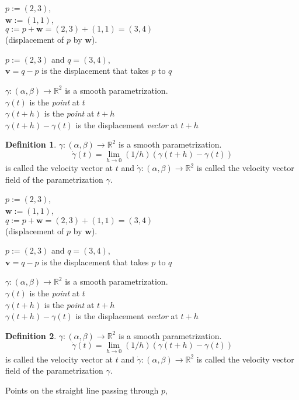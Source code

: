 \documentclass[twocolumn,20pt,fleqn]{extarticle}
\newcommand{\sep}{\vspace{0.5cm}}
\theoremstyle{plain}
\theoremstyle{definition}
\newtheorem*{definition}{Definition}
\theoremstyle{remark}
\begin{document}
$p := (2,3)$,\\ $\mathbf{w} := (1,1)$,\\ $q:=p + \mathbf{w} = (2,3) + (1,1) = (3,4)$ \\ (displacement of $p$ by $\mathbf{w}$).

\sep
$p := (2,3)$ and $q=(3,4)$,\\
$\mathbf{v}= q - p$ is the displacement that takes $p$ to $q$ 
\sep

$\gamma : (\alpha,\beta) \to \mathbb{R}^2$ is a smooth parametrization.\\
$\gamma(t)$ is the \emph{point} at $t$\\
$\gamma(t+h)$ is the \emph{point} at $t+h$\\
$\gamma(t+h)-\gamma(t)$ is the displacement \emph{vector} at $t+h$\\



\begin{definition}
$\gamma : (\alpha,\beta) \to \mathbb{R}^2$ is a smooth parametrization.
\[\dot{\gamma}(t) = \lim_{h\to 0} (1/h)(\gamma(t+h) - \gamma(t))\]
is called the velocity vector at $t$ and $\dot{\gamma} : (\alpha, \beta) \to \mathbb{R}^2$ is called the velocity vector field of the parametrization $\gamma$.
\end{definition}



\clearpage



$p := (2,3)$,\\ $\mathbf{w} := (1,1)$,\\ $q:=p + \mathbf{w} = (2,3) + (1,1) = (3,4)$ \\ (displacement of $p$ by $\mathbf{w}$).

\sep
$p := (2,3)$ and $q=(3,4)$,\\
$\mathbf{v}= q - p$ is the displacement that takes $p$ to $q$ 
\sep

$\gamma : (\alpha,\beta) \to \mathbb{R}^2$ is a smooth parametrization.\\
$\gamma(t)$ is the \emph{point} at $t$\\
$\gamma(t+h)$ is the \emph{point} at $t+h$\\
$\gamma(t+h)-\gamma(t)$ is the displacement \emph{vector} at $t+h$\\



\begin{definition}
$\gamma : (\alpha,\beta) \to \mathbb{R}^2$ is a smooth parametrization.
\[\dot{\gamma}(t) = \lim_{h\to 0} (1/h)(\gamma(t+h) - \gamma(t))\]
is called the velocity vector at $t$ and $\dot{\gamma} : (\alpha, \beta) \to \mathbb{R}^2$ is called the velocity vector field of the parametrization $\gamma$.
\end{definition}
\newpage
Points on the straight line passing through $p$,
\end{document}
